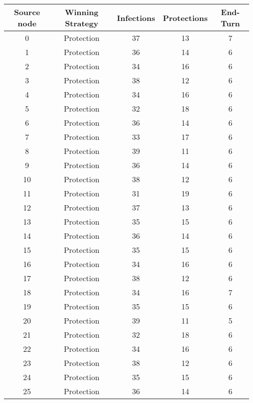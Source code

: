 \documentclass[results.tex]{subfiles}
\begin{document}
\begin{center}
  \begin{tabular}{| c || c | c | c | c |}
    \hline
    {\bfseries Source node} & {\bfseries Winning Strategy} & {\bfseries Infections} & {\bfseries Protections} & {\bfseries End-Turn} \\  %
    \hline\hline
    0 & Protection & 37 & 13 & 7 \\ 
    \hline
    1 & Protection & 36 & 14 & 6 \\ 
    \hline
    2 & Protection & 34 & 16 & 6 \\ 
    \hline
    3 & Protection & 38 & 12 & 6 \\ 
    \hline
    4 & Protection & 34 & 16 & 6 \\ 
    \hline
    5 & Protection & 32 & 18 & 6 \\ 
    \hline
    6 & Protection & 36 & 14 & 6 \\ 
    \hline
    7 & Protection & 33 & 17 & 6 \\ 
    \hline
    8 & Protection & 39 & 11 & 6 \\ 
    \hline
    9 & Protection & 36 & 14 & 6 \\ 
    \hline
    10 & Protection & 38 & 12 & 6 \\ 
    \hline
    11 & Protection & 31 & 19 & 6 \\ 
    \hline
    12 & Protection & 37 & 13 & 6 \\ 
    \hline
    13 & Protection & 35 & 15 & 6 \\ 
    \hline
    14 & Protection & 36 & 14 & 6 \\ 
    \hline
    15 & Protection & 35 & 15 & 6 \\ 
    \hline
    16 & Protection & 34 & 16 & 6 \\ 
    \hline
    17 & Protection & 38 & 12 & 6 \\ 
    \hline
    18 & Protection & 34 & 16 & 7 \\ 
    \hline
    19 & Protection & 35 & 15 & 6 \\ 
    \hline
    20 & Protection & 39 & 11 & 5 \\ 
    \hline
    21 & Protection & 32 & 18 & 6 \\ 
    \hline
    22 & Protection & 34 & 16 & 6 \\ 
    \hline
    23 & Protection & 38 & 12 & 6 \\ 
    \hline
    24 & Protection & 35 & 15 & 6 \\ 
    \hline
    25 & Protection & 36 & 14 & 6 \\ 

\end{tabular}
\end{center}
\end{document}
